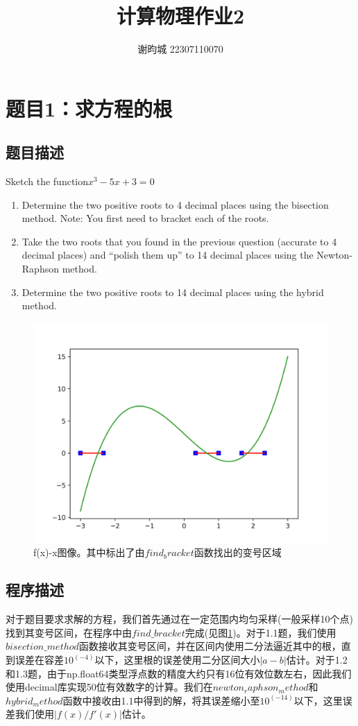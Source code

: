 \documentclass[11pt]{article}
\author{谢昀城 22307110070}
\title{计算物理作业2}
\begin{document}
\maketitle


\section{题目1：求方程的根}
\subsection{题目描述}
Sketch the function$x^3-5x+3=0$
\begin{enumerate}
    \item Determine the two positive roots to 4 decimal places using the bisection method. Note: You first need to bracket each of the roots.
    \item Take the two roots that you found in the previous question (accurate to 4 decimal places) and “polish them up” to 14 decimal places using the Newton-Raphson method.
    \item Determine the two positive roots to 14 decimal places using the hybrid method.
\end{enumerate}
\begin{figure}[!ht]
    \centering
    \includegraphics[width=0.6\linewidth]{photo/f(x) with bracket.png}
    \caption{f(x)-x图像。其中标出了由$find_bracket$函数找出的变号区域}
    \label{fig:1}
\end{figure}

\subsection{程序描述}
对于题目要求求解的方程，我们首先通过在一定范围内均匀采样(一般采样10个点)找到其变号区间，在程序中由$find\_bracket$完成(见图\ref{fig:1})。对于1.1题，我们使用$bisection\_method$函数接收其变号区间，并在区间内使用二分法逼近其中的根，直到误差在容差$10^(-4)$以下，这里根的误差使用二分区间大小$|a-b|$估计。对于1.2和1.3题，由于np.float64类型浮点数的精度大约只有16位有效位数左右，因此我们使用decimal库实现50位有效数字的计算。我们在$newton_raphson_method$和$hybrid_method$函数中接收由1.1中得到的解，将其误差缩小至$10^(-14)$以下，这里误差我们使用$|f(x)/f'(x)|$估计。
\end{document}
